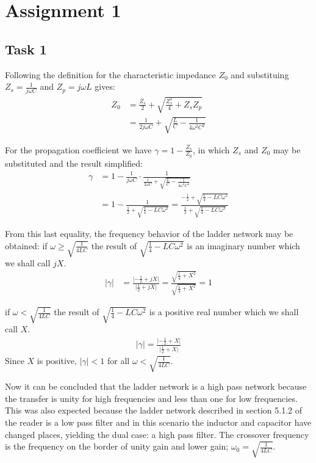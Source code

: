 \documentclass[11pt,titlepage]{report}
\begin{document}
\chapter{Assignment 1}
\section{Task 1}

Following the definition for the characteristic impedance $Z_0$ and substituing $Z_s=\frac{1}{j\omega C}$ and $Z_p=j\omega L$ gives:
\begin{align}
Z_0 &=\frac{Z_s}{2} + \sqrt{\frac{Z_s^2}{4}+Z_sZ_p} \nonumber \\
&= \frac{1}{2j\omega C} + \sqrt{\frac{L}{C}-\frac{1}{4\omega^2C^2}} 
\end{align}

For the propagation coefficient we have $\gamma = 1-\frac{Z_s}{Z_0}$, in which $Z_s$ and $Z_0$ may be substituted and the result simplified:
\begin{align}
\gamma &= 1 - \frac{1}{j\omega C}\cdot\frac{1}{\frac{1}{2\omega C}+\sqrt{\frac{L}{C}-\frac{1}{4\omega^2C^2}}} \nonumber \\
&= 1 - \frac{1}{\frac{1}{2}+\sqrt{\frac{1}{4}-LC\omega^2}} = \frac{-\frac{1}{2}+\sqrt{\frac{1}{4}-LC\omega^2}}{\frac{1}{2}+\sqrt{\frac{1}{4}-LC\omega^2}}
\end{align}

From this last equality, the frequency behavior of the ladder network may be obtained:
if $\omega\geq\sqrt{\frac{1}{4LC}}$ the result of $\sqrt{\frac{1}{4}-LC\omega^2}$ is an imaginary number which we shall call $jX$.
\begin{align}
\lvert\gamma\rvert &= \frac{\lvert -\frac{1}{2}+jX \rvert}{\lvert \frac{1}{2}+jX \rvert} = \frac{\sqrt{\frac{1}{4}+X^2}}{\sqrt{\frac{1}{4}+X^2}}=1
\end{align}

if $\omega < \sqrt{\frac{1}{4LC}}$ the result of $\sqrt{\frac{1}{4}-LC\omega^2}$ is a positive real number which we shall call $X$.
\begin{eqnarray}
\lvert\gamma\rvert = \frac{\lvert -\frac{1}{2}+X \rvert}{\lvert \frac{1}{2}+X \rvert}
\end{eqnarray}
Since $X$ is positive, $\lvert\gamma\rvert < 1$ for all $\omega < \sqrt{\frac{1}{4LC}}$. 

Now it can be concluded that the ladder network is a high pass network because the transfer is unity for high frequencies and less than one for low frequencies. This was also expected because the ladder network described in section 5.1.2 of the reader is a low pass filter and in this scenario the inductor and capacitor have changed places, yielding the dual case: a high pass filter. The crossover frequency is the frequency on the border of unity gain and lower gain; $\omega_0=\sqrt{\frac{1}{4LC}}$.
\end{document}
